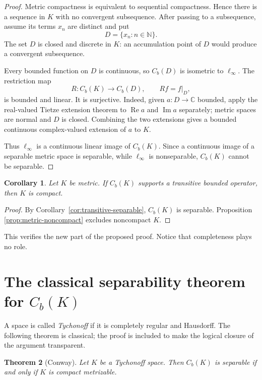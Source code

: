 \documentclass[11pt]{article}
\newtheorem{theorem}{Theorem}[section]
\newtheorem{corollary}[theorem]{Corollary}
\theoremstyle{remark}
\newcommand{\Cb}{C_b}
\newcommand{\N}{\mathbb N}
\newcommand{\C}{\mathbb C}
\newcommand{\ellinf}{\ell_\infty}
\begin{document}
\begin{proof}
Metric compactness is equivalent to sequential compactness.  Hence there is a
sequence in $K$ with no convergent subsequence.  After passing to a
subsequence, assume its terms $x_n$ are distinct and put
\[
  D=\{x_n:n\in\N\}.
\]
The set $D$ is closed and discrete in $K$: an accumulation point of $D$ would
produce a convergent subsequence.

Every bounded function on $D$ is continuous, so $\Cb(D)$ is isometric to
$\ellinf$.  The restriction map
\[
  R:\Cb(K)\longrightarrow \Cb(D),\qquad Rf=f|_D,
\]
is bounded and linear.  It is surjective.  Indeed, given
$a:D\to\C$ bounded, apply the real-valued Tietze extension theorem to
$\operatorname{Re}a$ and $\operatorname{Im}a$ separately; metric spaces are
normal and $D$ is closed.  Combining the two extensions gives a bounded
continuous complex-valued extension of $a$ to $K$.

Thus $\ellinf$ is a continuous linear image of $\Cb(K)$.  Since a continuous
image of a separable metric space is separable, while $\ellinf$ is
nonseparable, $\Cb(K)$ cannot be separable.
\end{proof}

\begin{corollary}\label{cor:metric-necessity}
Let $K$ be metric.  If $\Cb(K)$ supports a transitive bounded operator, then
$K$ is compact.
\end{corollary}

\begin{proof}
By Corollary~\ref{cor:transitive-separable}, $\Cb(K)$ is separable.  Proposition
\ref{prop:metric-noncompact} excludes noncompact $K$.
\end{proof}

This verifies the new part of the proposed proof.  Notice that completeness
plays no role.

\section{The classical separability theorem for $C_b(K)$}

A space is called \emph{Tychonoff} if it is completely regular and Hausdorff.
The following theorem is classical; the proof is included to make the logical
closure of the argument transparent.

\begin{theorem}[Conway]\label{thm:conway}
Let $K$ be a Tychonoff space.  Then $\Cb(K)$ is separable if and only if $K$ is
compact metrizable.
\end{theorem}
\end{document}
